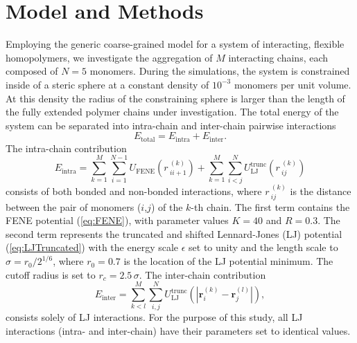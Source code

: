 \documentclass[12pt]{report}
\begin{document}
\section{Model and Methods}
\label{sec:modmeth}
%
Employing the generic coarse-grained model for a system of interacting, flexible homopolymers, we investigate the aggregation of $M$ interacting chains, each composed of $N = 5$ monomers. During the simulations, the system is constrained inside of a steric sphere at a constant density of $10^{-3}$ monomers per unit volume. At this density the radius of the constraining sphere is larger than the length of the fully extended polymer chains under investigation. The total energy of the system can be separated into intra-chain and inter-chain pairwise interactions
\begin{equation}
E_{\mathrm{total}} = E_{\mathrm{intra}} + E_{\mathrm{inter}}.
\end{equation}
%
The intra-chain contribution 
\begin{equation}
E_{\mathrm{intra}} = \sum^{M}_{k = 1}\sum^{N-1}_{i = 1}
U_{\mathrm{FENE}}(r\,^{(k)}_{ii+1}) +
\sum^{M}_{k=1}\sum^{N}_{i<j}
U_{\mathrm{LJ}}^{\mathrm{trunc}}(r\,^{(k)}_{ij})
\end{equation}
%
consists of both bonded and non-bonded interactions, where $r\,^{(k)}_{ij}$ is the distance between the pair of monomers ($i$,$j$) of the $k$-th chain. The first term contains the FENE potential (\ref{eq:FENE}), with parameter values $K=40$ and $R=0.3$. The second term represents the truncated and shifted Lennard-Jones (LJ) potential (\ref{eq:LJTruncated}) with the energy scale $\epsilon$ set to unity and the length scale to $\sigma=r_0/2^{1/6}$, where $r_0 = 0.7$ is the location of the LJ potential minimum. The cutoff radius is set to $r_c=2.5\,\sigma$. The inter-chain contribution
%
\begin{equation}
E_{\mathrm{inter}} = \sum^{M}_{k < l} \sum^{N}_{i,j}U_{\mathrm{LJ}}^{\mathrm{trunc}}(|\textbf{r}^{(k)}_{i} - \textbf{r}^{(l)}_{j}|),
\end{equation}
%
consists solely of LJ interactions. For the purpose of this study, all LJ interactions (intra- and inter-chain) have their parameters set to identical values.
%

\newpage
\end{document}
